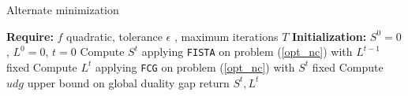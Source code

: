 \begin{algorithm*}
\caption{Alternate minimization}
\label{alg:alt}
\begin{algorithmic}[1]
\State\textbf{Require: } $f$ quadratic, tolerance $\epsilon$ , maximum iterations $T$
\State\textbf{Initialization: } $S^{0}=0$, $L^{0}=0$, $t=0$
\State Compute $S^{t}$ applying \texttt{FISTA} on problem (\ref{opt_nc}) with $L^{t-1}$ fixed
\State Compute $L^{t}$ applying \texttt{FCG} on problem (\ref{opt_nc}) with $S^{t}$ fixed
\State Compute $udg$ upper bound on global duality gap
\State return $S^{t}, L^{t}$
\EndIf
\EndFor
\end{algorithmic}
\end{algorithm*}




